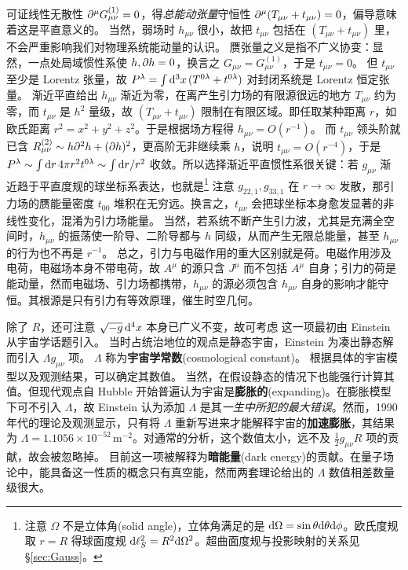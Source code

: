 可证线性无散性 $\partial^\mu G_{\mu\nu}^{(1)}=0$，得\emph{总能动张量}守恒性 $\partial^\mu(T_{\mu\nu} + t_{\mu\nu})=0$，偏导意味着这是平直意义的。
当然，弱场时 $h_{\mu\nu}$ 很小，故把 $t_{\mu\nu}$ 包括在 $(T_{\mu\nu} + t_{\mu\nu})$ 里，不会严重影响我们对物理系统能动量的认识。
赝张量之义是指不广义协变：显然，一点处局域惯性系使 $h,\partial h = 0$，换言之 $G_{\mu\nu}=G_{\mu\nu}^{(1)}$，于是 $t_{\mu\nu}=0$。
但 $t_{\mu\nu}$ 至少是 Lorentz 张量，故 $P^\lambda = \int \dd[3]{x} (T^{0\lambda} + t^{0\lambda})$ 对封闭系统是 Lorentz 恒定张量。
渐近平直给出 $h_{\mu\nu}$ 渐近为零，在离产生引力场的有限源很远的地方 $T_{\mu\nu}$ 约为零，而 $t_{\mu\nu}$ 是 $h^2$ 量级，故 $(T_{\mu\nu} + t_{\mu\nu})$ 限制在有限区域。即任取某种距离 $r$，如欧氏距离 $r^2=x^2+y^2+z^2$。于是根据场方程得 $h_{\mu\nu}=O(r^{-1})$。
而 $t_{\mu\nu}$ 领头阶就已含 $R^{(2)}_{\mu\nu} \sim h \partial^2 h + (\partial h)^2$，更高阶无非继续乘 $h$，说明 $t_{\mu\nu}=O(r^{-4})$，于是 $P^\lambda\sim \int \dd{r} 4\pi r^2 t^{0\lambda} \sim \int \dd r/r^2$ 收敛。所以选择渐近平直惯性系很关键：若 $g_{\mu\nu}$ 渐近趋于平直度规的球坐标系表达，也就是\footnote{注意 $\Omega$ 不是立体角(solid angle)，立体角满足的是 $\dd\Omega=\sin\theta \dd\theta\dd\phi$。欧氏度规取 $r=R$ 得球面度规 $\dd\ell^2_S=R^2\dd\Omega^2$。超曲面度规与投影映射的关系见 \S\ref{sec:Gauss}。}
注意 $g_{22,1},g_{33,1}$ 在 $r\to\infty$ 发散，那引力场的赝能量密度 $t_{00}$ 堆积在无穷远。换言之，$t_{\mu\nu}$ 会把球坐标本身愈发显著的非线性变化，混淆为引力场能量。
当然，若系统不断产生引力波，尤其是充满全空间时，$h_{\mu\nu}$ 的振荡使一阶导、二阶导都与 $h$ 同级，从而产生无限总能量，甚至 $h_{\mu\nu}$ 的行为也不再是 $r^{-1}$。
总之，引力与电磁作用的重大区别就是荷。电磁作用涉及电荷，电磁场本身不带电荷，故 $A^\mu$ 的源只含 $J^\mu$ 而不包括 $A^\mu$ 自身；引力的荷是能动量，然而电磁场、引力场都携带，$h_{\mu\nu}$ 的源必须包含 $h_{\mu\nu}$ 自身的影响才能守恒。其根源是只有引力有等效原理，催生时空几何。

除了 $R$，还可注意 $\sqrt{-g}\dd[4]{x}$ 本身已广义不变，故可考虑
这一项最初由 Einstein 从宇宙学话题引入。
当时占统治地位的观点是静态宇宙，Einstein 为凑出静态解而引入 $\Lambda g_{\mu\nu}$ 项。
$\Lambda$ 称为\textbf{宇宙学常数}(cosmological constant)。
根据具体的宇宙模型以及观测结果，可以确定其数值。
当然，在假设静态的情况下也能强行计算其值。但现代观点自 Hubble 开始普遍认为宇宙是\textbf{膨胀的}(expanding)。在膨胀模型下可不引入 $\Lambda$，故 Einstein 认为添加 $\Lambda$ 是其\emph{一生中所犯的最大错误}。然而，1990 年代的理论及观测显示，只有将 $\Lambda$ 重新写进来才能解释宇宙的\textbf{加速膨胀}，其结果为 $\Lambda=1.1056\times 10^{-52}$\,m$^{-2}$。对通常的分析，这个数值太小，远不及 $\frac12 g_{\mu\nu} R$ 项的贡献，故会被忽略掉。
目前这一项被解释为\textbf{暗能量}(dark energy)的贡献。在量子场论中，能具备这一性质的概念只有真空能，然而两套理论给出的 $\Lambda$ 数值相差数量级很大。

